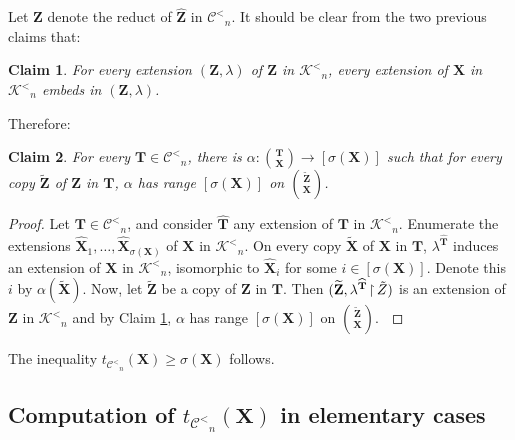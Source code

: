 \documentclass[reqno]{amsart}
\newtheorem{claimm}{Claim}
\begin{document}
Let ${\textbf{{Z}}}$ denote the reduct of ${\widehat{\textbf{{Z}}}}$ in ${\mathcal{C}^<} _n$. It should be clear from the two previous claims that: 

\begin{claimm}
\label{claim:extoK}
For every extension $({\textbf{{Z}}}, \lambda)$ of ${\textbf{{Z}}}$ in ${\mathcal{K}^<} _n$, every extension of ${\textbf{{X}}}$ in ${\mathcal{K}^<} _n$ embeds in $({\textbf{{Z}}}, \lambda)$. 
\end{claimm}

Therefore: 

\begin{claimm}
\label{claim:RdoC}
For every ${\textbf{{T}}} \in {\mathcal{C}^<} _n$, there is $\alpha : {{\binom{{\textbf{{T}}}}{{\textbf{{X}}}}} \longrightarrow {[\sigma({\textbf{{X}}})]}}$ such that for every copy ${\widetilde{\textbf{{Z}}}}$ of ${\textbf{{Z}}}$ in ${\textbf{{T}}}$, $\alpha$ has range $[\sigma({\textbf{{X}}})]$ on $\binom{{\widetilde{\textbf{{Z}}}}}{{\textbf{{X}}}}$.   
\end{claimm}

\begin{proof}
Let ${\textbf{{T}}} \in {\mathcal{C}^<} _n$, and consider ${\widehat{\textbf{{T}}}}$ any extension of ${\textbf{{T}}}$ in ${\mathcal{K}^<} _n$. Enumerate the extensions ${\widehat{\textbf{{X}}}}_1 ,\ldots, {\widehat{\textbf{{X}}}}_{\sigma({\textbf{{X}}})}$ of ${\textbf{{X}}}$ in ${\mathcal{K}^<} _n$. On every copy ${\widetilde{\textbf{{X}}}}$ of ${\textbf{{X}}}$ in ${\textbf{{T}}}$, $\lambda^{{\widehat{\textbf{{T}}}}}$ induces an extension of ${\textbf{{X}}}$ in ${\mathcal{K}^<}_n$, isomorphic to ${\widehat{\textbf{{X}}}}_i$ for some $i \in [\sigma({\textbf{{X}}})]$. Denote this $i$ by $\alpha({\widetilde{\textbf{{X}}}})$. Now, let ${\widetilde{\textbf{{Z}}}}$ be a copy of ${\textbf{{Z}}}$ in ${\textbf{{T}}}$. Then $({\widetilde{\textbf{{Z}}}}, {{\lambda^{{\widehat{\textbf{{T}}}}}}\mspace{-2mu}\mathbin{\upharpoonright}\mspace{-1mu} {\tilde{Z}}})$ is an extension of ${\textbf{{Z}}}$ in ${\mathcal{K}^<} _n$ and by Claim \ref{claim:extoK}, $\alpha$ has range $[\sigma({\textbf{{X}}})]$ on $\binom{{\widetilde{\textbf{{Z}}}}}{{\textbf{{X}}}}$. $\qedhere$ \end{proof}

The inequality $t_{{\mathcal{C}^<} _n}({\textbf{{X}}}) \geq \sigma({\textbf{{X}}})$ follows. 

\subsection{Computation of $t_{{\mathcal{C}^<} _n}({\textbf{{X}}})$ in elementary cases}
\end{document}
